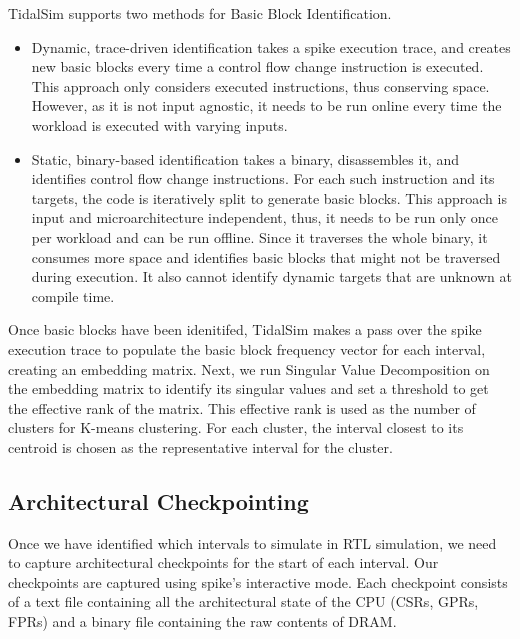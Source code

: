 \documentclass[sigplan,nonacm,10pt]{acmart}
\begin{document}

TidalSim supports two methods for Basic Block Identification.
\begin{itemize}
  \item Dynamic, trace-driven identification takes a spike execution trace, and creates new basic blocks every time a control flow change instruction is executed. 
  This approach only considers executed instructions, thus conserving space. However, as it is not input agnostic, it needs to be run online every time the workload is executed with varying inputs. 
  \item Static, binary-based identification takes a binary, disassembles it, and identifies control flow change instructions. For each such instruction and its targets, the code is iteratively split to generate basic blocks. 
  This approach is input and microarchitecture independent, thus, it needs to be run only once per workload and can be run offline. Since it traverses the whole binary, it consumes more space and identifies basic blocks that might not be traversed during execution. It also cannot identify dynamic targets that are unknown at compile time. 
\end{itemize}

Once basic blocks have been idenitifed, TidalSim makes a pass over the spike execution trace to populate the basic block frequency vector for each interval, creating an embedding matrix. Next, we run Singular Value Decomposition on the embedding matrix to identify its singular values and set a threshold to get the effective rank of the matrix. This effective rank is used as the number of clusters for K-means clustering. 
For each cluster, the interval closest to its centroid is chosen as the representative interval for the cluster.

\subsection{Architectural Checkpointing}

Once we have identified which intervals to simulate in RTL simulation, we need to capture architectural checkpoints for the start of each interval.
Our checkpoints are captured using spike's interactive mode.
Each checkpoint consists of a text file containing all the architectural state of the CPU (CSRs, GPRs, FPRs) and a binary file containing the raw contents of DRAM.
\end{document}
